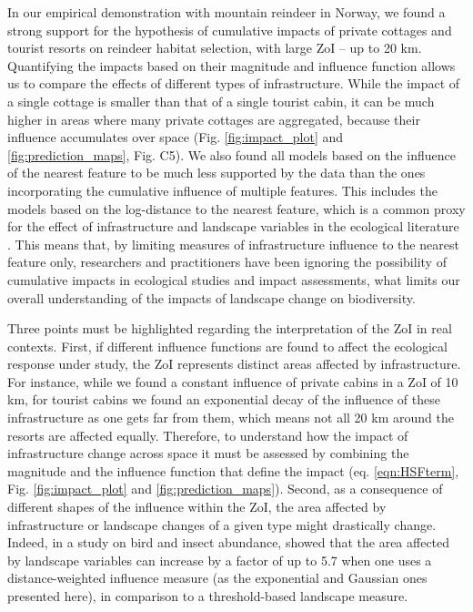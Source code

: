 \documentclass[titlepage]{article}
\begin{document}
In our empirical demonstration with mountain reindeer in Norway, we found a strong support for the hypothesis of cumulative impacts of private cottages and tourist resorts on reindeer habitat selection, with large ZoI -- up to 20 km. Quantifying the impacts based on their magnitude and influence function allows us to compare the effects of different types of infrastructure. While the impact of a single cottage is smaller than that of a single tourist cabin, it can be much higher in areas where many private cottages are aggregated, because their influence accumulates over space (Fig. \ref{fig:impact_plot} and \ref{fig:prediction_maps}, Fig. C5). We also found all models based on the influence of the nearest feature to be much less supported by the data than the ones incorporating the cumulative influence of multiple features. This includes the models based on the log-distance to the nearest feature, which is a common proxy for the effect of infrastructure and landscape variables in the ecological literature \citep[e.g.][]{torres_assessing_2016,polfus_identifying_2011}. This means that, by limiting measures of infrastructure influence to the nearest feature only, researchers and practitioners have been ignoring the possibility of cumulative impacts in ecological studies and impact assessments, what limits our overall understanding of the impacts of landscape change on biodiversity.

Three points must be highlighted regarding the interpretation of the ZoI in real contexts.
First, if different influence functions are found to affect the ecological response under study, the ZoI represents distinct areas affected by infrastructure. For instance, while we found a constant influence of private cabins in a ZoI of 10 km, for tourist cabins we found an exponential decay of the influence of these infrastructure as one gets far from them, which means not all 20 km around the resorts are affected equally. Therefore, to understand how the impact of infrastructure change across space it must be assessed by combining the magnitude and the influence function that define the impact (eq. \ref{eqn:HSFterm}, Fig. \ref{fig:impact_plot} and \ref{fig:prediction_maps}). Second, as a consequence of different shapes of the influence within the ZoI, the area affected by infrastructure or landscape changes of a given type might drastically change. Indeed, in a study on bird and insect abundance, \citet{miguet_how_2017} showed that the area affected by landscape variables can increase by a factor of up to 5.7 when one uses a distance-weighted influence measure (as the exponential and Gaussian ones presented here), in comparison to a threshold-based landscape measure. 
\end{document}
